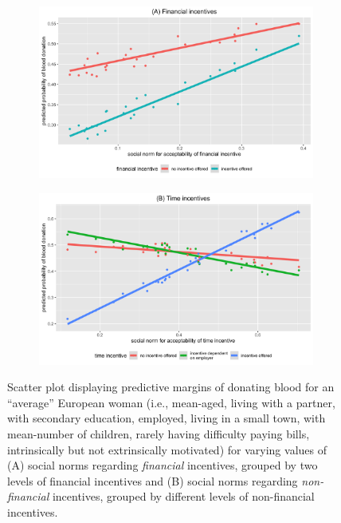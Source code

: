 \documentclass[AER]{AEA}
\begin{document}
\begin{figure}[t!]
\begin{subfigure}{1.03\textwidth}
  \centering
  \includegraphics[width=.8\linewidth]{images/pred_SOC_incentives_financial_raw.png}  
\end{subfigure}
\begin{subfigure}{1.03\textwidth}
  \centering
  \includegraphics[width=.8\linewidth]{images/pred_SOC_incentives_time_raw.png}  
\end{subfigure}
\caption{Scatter plot displaying predictive margins of donating blood for an “average” European woman (i.e., mean-aged, living with a partner, with secondary education, employed, living in a small town, with mean-number of children, rarely having difficulty paying bills, intrinsically but not extrinsically motivated) for varying values of (A) social norms regarding \textit{financial} incentives, grouped by two levels of financial incentives and (B) social norms regarding \textit{non-financial} incentives, grouped by different levels of non-financial incentives.}
\label{fig:interactions}
\end{figure}
\end{document}
